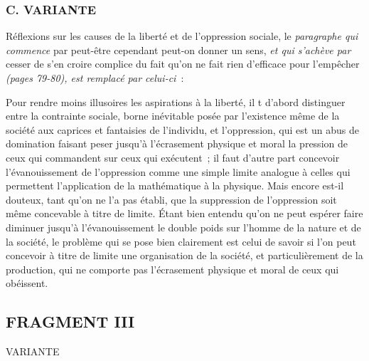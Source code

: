 \documentclass[french,twoside]{book} %
\begin{document}
\subsubsection[{C. VARIANTE}]{C. VARIANTE}
 Réflexions sur les causes de la liberté et de l'oppression sociale, le {\itshape paragraphe qui commence} par peut-être cependant peut-on donner un sens, {\itshape et qui s'achève par} cesser de s'en croire complice du fait qu'on ne fait rien d'efficace pour l'empêcher {\itshape (pages 79-80), est remplacé par celui-ci} :\par
Pour rendre moins illusoires les aspirations à la liberté, il t d'abord distinguer entre la contrainte sociale, borne inévitable posée par l'existence même de la société aux caprices et fantaisies de l'individu, et l'oppression, qui est un abus de domination faisant peser jusqu'à l'écrasement physique et moral la pression de ceux qui commandent sur ceux qui exécutent ; il faut d'autre part concevoir l'évanouissement de l'oppression comme une simple limite analogue à celles qui permettent l'application de la mathématique à la physique. Mais encore est-il douteux, tant qu'on ne l'a pas établi, que la suppression de l'oppression soit même concevable à titre de limite. Étant bien entendu qu'on ne peut espérer faire diminuer jusqu'à l'évanouissement le double poids sur l'homme de la nature et de la société, le problème qui se pose bien clairement est celui de savoir si l'on peut concevoir à titre de limite une organisation de la société, et particulièrement de la production, qui ne comporte pas l'écrasement physique et moral de ceux qui obéissent.
\subsection[{FRAGMENT III}]{FRAGMENT III}

\begin{center}
\noindent \centerline{VARIANTE}\par
\end{center}
\end{document}
